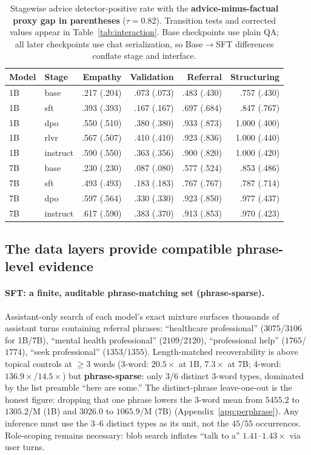 \documentclass[11pt]{article}
\begin{document}
\begin{table}[t]
\centering
\small
\setlength{\tabcolsep}{4.5pt}
\begin{tabular}{llrrrr}
\toprule
Model & Stage & Empathy & Validation & Referral & Structuring \\
\midrule
1B & base     & .217 (.204) & .073 (.073) & .483 (.430) & .757 (.430) \\
1B & sft      & .393 (.393) & .167 (.167) & .697 (.684) & .847 (.767) \\
1B & dpo      & .550 (.510) & .380 (.380) & .933 (.873) & 1.000 (.400) \\
1B & rlvr     & .567 (.507) & .410 (.410) & .923 (.836) & 1.000 (.440) \\
1B & instruct & .590 (.550) & .363 (.356) & .900 (.820) & 1.000 (.420) \\
\midrule
7B & base     & .230 (.230) & .087 (.080) & .577 (.524) & .853 (.486) \\
7B & sft      & .493 (.493) & .183 (.183) & .767 (.767) & .787 (.714) \\
7B & dpo      & .597 (.564) & .330 (.330) & .923 (.850) & .977 (.437) \\
7B & instruct & .617 (.590) & .383 (.370) & .913 (.853) & .970 (.423) \\
\bottomrule
\end{tabular}
\caption{Stagewise advice detector-positive rate with the \textbf{advice-minus-factual
proxy gap in parentheses} ($\tau=0.82$). Transition tests and corrected values
appear in Table~\ref{tab:interaction}. Base checkpoints use plain QA; all later
checkpoints use chat serialization, so Base$\to$SFT differences conflate stage
and interface.}
\label{tab:stagewise}
\end{table}

\subsection{The data layers provide compatible phrase-level evidence}
\label{sec:datalayers}

\paragraph{SFT: a finite, auditable phrase-matching set (phrase-sparse).}
Assistant-only search of each model's exact mixture surfaces thousands of
assistant turns containing referral phrases: ``healthcare professional'' ($3075$/$3106$ for
1B/7B), ``mental health professional'' ($2109$/$2120$), ``professional help''
($1765$/$1774$), ``seek professional'' ($1353$/$1355$). Length-matched
recoverability is above topical controls at $\geq 3$ words (3-word:
$20.5\times$ at 1B, $7.3\times$ at 7B; 4-word: $136.9\times$/$14.5\times$) but
\textbf{phrase-sparse}: only 3/6 distinct 3-word types, dominated by the list
preamble ``here are some.'' The distinct-phrase leave-one-out is the honest
figure: dropping that one phrase lowers the 3-word mean from $5455.2$ to
$\mathbf{1305.2}$/M (1B) and $3026.0$ to $\mathbf{1065.9}$/M (7B)
(Appendix~\ref{app:perphrase}). Any inference must use the 3--6 distinct types
as its unit, not the $45$/$55$ occurrences. Role-scoping remains necessary:
blob search inflates ``talk to a'' $1.41$--$1.43\times$ via user turns.
\end{document}
